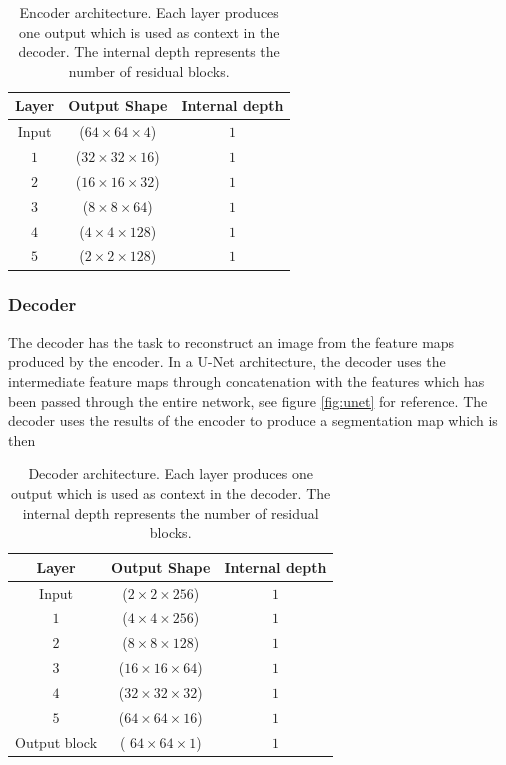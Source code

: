 \documentclass[fleqn,10pt]{SelfArx} %
\begin{document}
\begin{table}[!h]
  \centering
  \caption{Encoder architecture. Each layer produces one output which is used as context in the decoder. The internal depth represents the number of residual blocks.}
  \label{tab:model_architecture}
  \begin{tabular}{|c|c|c|}
    \hline
    \textbf{Layer} & \textbf{Output Shape} & \textbf{Internal depth}\\
    \hline
    \hline
    Input & ($64\times64\times4$) & $1$\\
    \hline
    $1$ & ($32\times32\times16$) & $1$\\
    \hline
    $2$ & ($16\times16\times32$) & $1$\\
    \hline
    $3$ & ($8\times8\times64$) & $1$\\
    \hline
    $4$ & ($4\times4\times128$) & $1$\\
    \hline
    $5$ & ($2\times2\times128$) & $1$\\
    \hline
  \end{tabular}
\end{table}
\subsubsection{Decoder}
The decoder has the task to reconstruct an image from the feature maps produced by the encoder. In a U-Net architecture, the decoder uses the intermediate feature maps through concatenation with the features which has been passed through the entire network, see figure \ref{fig:unet} for reference. The decoder uses the results of the encoder to produce a segmentation map which is then
\begin{table}[!h]
  \centering
  \caption{Decoder architecture. Each layer produces one output which is used as context in the decoder. The internal depth represents the number of residual blocks.}
  \label{tab:model_architecture}
  \begin{tabular}{|c|c|c|}
    \hline
    \textbf{Layer} & \textbf{Output Shape} & \textbf{Internal depth}\\
    \hline
    \hline
    Input & ($2\times2\times256$) & $1$\\
    \hline
    $1$ & ($4\times4\times256$) & $1$\\
    \hline
    $2$ & ($8\times8\times128$) & $1$\\
    \hline
    $3$ & ($16\times16\times64$) & $1$\\
    \hline
    $4$ & ($32\times32\times32$) & $1$\\
    \hline
    $5$ & ($64\times64\times16$) & $1$\\
    \hline
    Output block & ( $64\times64\times1$) & $1$\\
    \hline
  \end{tabular}
\end{table}
\end{document}

